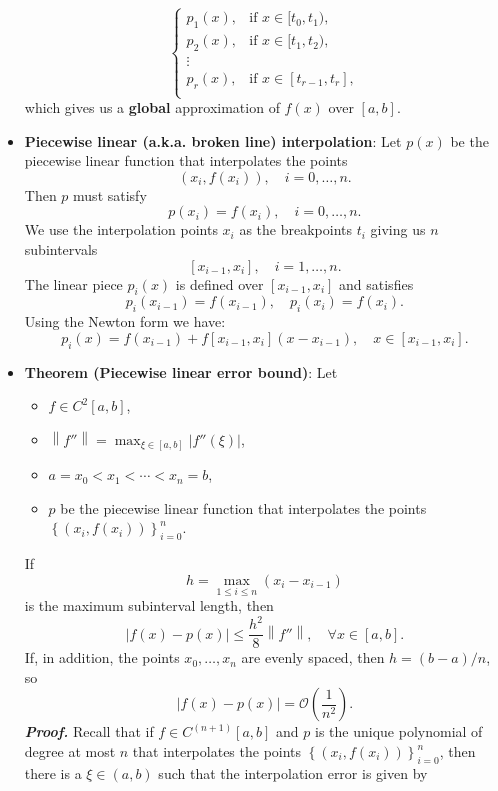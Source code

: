 \documentclass{report}
\begin{document}
\begin{itemize}
$$\begin{cases}
                p_1(x),& \text{if $x \in [t_0,t_1)$},\\
                p_2(x),& \text{if $x \in [t_1,t_2)$},\\
                \vdots & \\
                p_{r}(x),& \text{if $x \in [t_{r-1},t_r]$},\\
            \end{cases}
            $$
            which gives us a \textbf{global} approximation of $f(x)$ over $[a,b]$.
        \item \textbf{Piecewise linear (a.k.a. broken line) interpolation}:
            Let $p(x)$ be the piecewise linear function that interpolates the points
            $$(x_i, f(x_i)), \quad i=0,\ldots,n.$$
            Then $p$ must satisfy
            $$p(x_i) = f(x_i), \quad i=0,\ldots,n.$$
            We use the interpolation points $x_i$ as the breakpoints $t_i$ giving us $n$ subintervals
            $$[x_{i-1},x_{i}], \quad i=1,\ldots,n.$$
            The linear piece $p_i(x)$ is defined over $[x_{i-1},x_{i}]$ and satisfies
            $$p_i(x_{i-1}) = f(x_{i-1}), \quad p_i(x_{i}) = f(x_{i}).$$
            Using the Newton form we have:
            $$p_i(x) = f(x_{i-1}) + f[x_{i-1},x_{i}](x-x_{i-1}), \quad x \in [x_{i-1}, x_{i}].$$
        \item \textbf{Theorem (Piecewise linear error bound)}:
            Let 
            \begin{itemize}
                \item $f \in C^2[a,b]$,
                \item $\left\|f''\right\| = \max_{\xi \in [a,b]} \left|f''(\xi)\right|$,
                \item $a = x_0 < x_1 < \cdots < x_n = b$,
                \item $p$ be the piecewise linear function that interpolates the points $\left\{(x_i,f(x_i))\right\}_{i=0}^n$. 
            \end{itemize}
            If
            $$h = \max_{1 \leq i \leq n} (x_i - x_{i-1})$$
            is the maximum subinterval length, then
            $$\left|f(x) - p(x)\right| \leq \frac{h^2}{8} \left\|f''\right\|, \quad \forall x \in [a,b].$$
            If, in addition, the points $x_0,\ldots,x_n$ are evenly spaced, then $h = (b-a)/n$, so
            $$\left|f(x) - p(x)\right| = \mathcal{O}\left(\frac{1}{n^2}\right).$$
            \bigbreak \noindent 
            \textbf{\textit{Proof.}}
            Recall that if $f \in C^{(n+1)}[a,b]$ and $p$ is the unique polynomial of degree at most $n$ that interpolates the points $\left\{(x_i, f(x_i))\right\}_{i=0}^n$, then there is a $\xi \in (a,b)$ such that the interpolation error is given by

\end{itemize}
\end{document}
